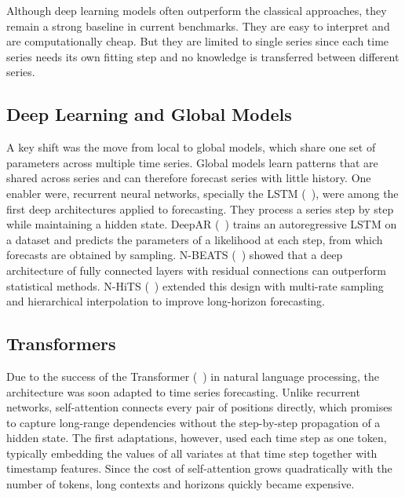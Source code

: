 Although deep learning models often outperform the classical approaches, they remain a strong baseline in current benchmarks. They are easy to interpret and are computationally cheap. But they are limited to single series since each time series needs its own fitting step and no knowledge is transferred between different series.   


\subsection{Deep Learning and Global Models}
\label{sec:rw_deep}

A key shift was the move from local to global models, which share one set of parameters across multiple time series. Global models learn patterns that are shared across series and can therefore forecast series with little history. One enabler were, recurrent neural networks, specially the LSTM (\citeauthor{lstm}~\cite{lstm}), were among the first deep architectures applied to forecasting. They process a series step by step while maintaining a hidden state. DeepAR (\citeauthor{deepar}~\cite{deepar}) trains an autoregressive LSTM on a dataset and predicts the parameters of a likelihood at each step, from which forecasts are obtained by sampling. N-BEATS (\citeauthor{nbeats}~\cite{nbeats}) showed that a deep architecture of fully connected layers with residual connections can outperform statistical methods. N-HiTS (\citeauthor{nhits}~\cite{nhits}) extended this design with multi-rate sampling and hierarchical interpolation to improve long-horizon forecasting. 


\subsection{Transformers}
\label{sec:rw_transformers}

Due to the success of the Transformer (\citeauthor{transformerbase}~\cite{transformerbase}) in natural language processing, the architecture was soon adapted to time series forecasting. Unlike recurrent networks, self-attention connects every pair of positions directly, which promises to capture long-range dependencies without the step-by-step propagation of a hidden state. The first adaptations, however, used each time step as one token, typically embedding the values of all variates at that time step together with timestamp features. Since the cost of self-attention grows quadratically with the number of tokens, long contexts and horizons quickly became expensive.

